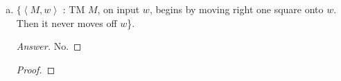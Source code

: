 \documentclass[10pt]{article}
\newcommand{\brackets}[1]{\left< #1 \right>}
\begin{document}
\begin{enumerate}[1)]
\begin{enumerate}[a)]
\begin{proof}[Proof]
\begin{enumerate}[1.]
\item
Return $\brackets{M\#, w}$.
\end{enumerate}
If there were a machine to decide this language, call it $Oracle$ then $C = Oracle(R(\brackets{M, w}))$ would decide $H$.\\
If $\brackets{M, w} \in H$:  $M$ halts on $w$, so $M\#$ accepts everything.  In particular, it accepts \texttt{ab}.  $Oracle(\brackets{M\#})$ accepts.\\
If $\brackets{M, w} \not \in H$:  $M$ halts on $w$, so $M\#$ does not halt on any input.  In particular, it does not halt on \texttt{ab}.  $Oracle(\brackets{M\#})$ rejects.
\end{proof}

\item
$\{\brackets{M, w}$ : TM $M$, on input $w$, begins by moving right one square onto $w$.  Then it never moves off $w$\}.
\begin{proof}[Answer]
No.
\end{proof}
\begin{proof}[Proof]
\end{proof}


\end{enumerate}
\end{enumerate}
\end{document}
